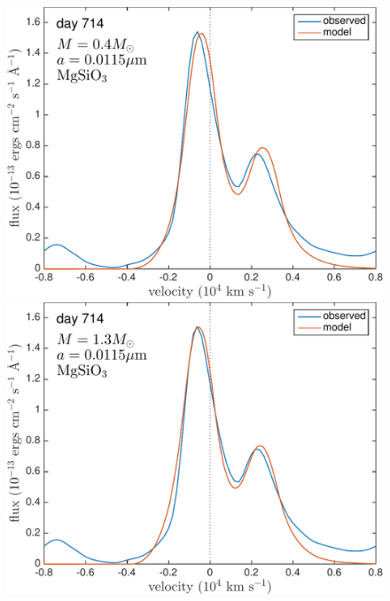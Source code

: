 \begin{figure}
\includegraphics[trim =0 20 0 0,clip=true,scale=0.33]{chapters/chapter5/images/silicates_take2/OI/MgSiO3_Dwek.pdf}
\hspace{3mm}
\includegraphics[trim =0 20 0 -25,clip=true,scale=0.33]{chapters/chapter5/images/silicates_take2/OI/MgSiO3_bestfit.pdf}


\end{figure}
